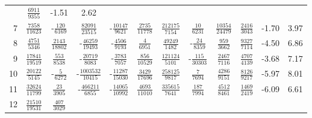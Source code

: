 \documentclass[letterpaper,11pt,nointlimits,reqno,draft]{amsbook}
\begin{document}
\begin{table}
\begin{tabular}{r|ccccccccc|c@{ -- }c@{\%}}
&  $\frac{            6911}{            9355}$
&  -1.51 &  2.62
\\
7
&  $\frac{            7358}{           11623}$
& -$\frac{             120}{            6169}$
&  $\frac{           82091}{           23515}$
& -$\frac{           10147}{            9621}$
&  $\frac{            2735}{           11778}$
&  $\frac{          212175}{            7154}$
&  $\frac{              10}{            6231}$
&  $\frac{           10354}{           24479}$
&  $\frac{            2416}{            3043}$
&  -1.70 &  3.97
\\
8
&  $\frac{            4751}{            5346}$
&  $\frac{            2143}{           18802}$
& -$\frac{           46259}{           19493}$
& -$\frac{            4506}{            9193}$
&  $\frac{               4}{            6951}$
&  $\frac{           49249}{            1482}$
& -$\frac{              24}{            8359}$
&  $\frac{             959}{            3662}$
&  $\frac{            9327}{            7114}$
&  -4.50 &  6.86
\\
9
&  $\frac{           17841}{           19519}$
&  $\frac{             553}{            8538}$
& -$\frac{           20719}{            8083}$
& -$\frac{            3783}{            7057}$
&  $\frac{             856}{           10529}$
&  $\frac{          121124}{            5101}$
& -$\frac{             115}{           30303}$
&  $\frac{            2467}{            7116}$
&  $\frac{            4707}{            4139}$
&  -3.68 &  7.17
\\
10
&  $\frac{           20122}{            5145}$
& -$\frac{               5}{            6272}$
& -$\frac{         1003532}{           10415}$
& -$\frac{           11287}{           15030}$
&  $\frac{            3429}{           17696}$
&  $\frac{          258125}{            9817}$
&  $\frac{               7}{            7694}$
&  $\frac{            4286}{            9151}$
&  $\frac{            8126}{            9217}$
&  -5.97 &  8.01
\\
11
&  $\frac{           32624}{           11799}$
&  $\frac{              23}{            3905}$
& -$\frac{          466211}{            6855}$
& -$\frac{           14065}{           10992}$
&  $\frac{            4693}{           11010}$
&  $\frac{          335615}{            7641}$
&  $\frac{             187}{            7994}$
&  $\frac{            4512}{            8461}$
&  $\frac{            1469}{            2419}$
&  -6.09 &  6.61
\\
12
&  $\frac{           21510}{           19531}$
&  $\frac{             407}{            3029}$

\end{tabular}
\end{table}
\end{document}
